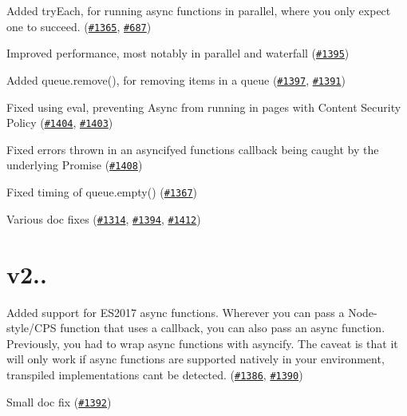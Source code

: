 \begin{DoxyItemize}
\item Added {\ttfamily try\+Each}, for running async functions in parallel, where you only expect one to succeed. (\href{https://github.com/caolan/async/issues/1365}{\tt \#1365}, \href{https://github.com/caolan/async/issues/687}{\tt \#687})
\item Improved performance, most notably in {\ttfamily parallel} and {\ttfamily waterfall} (\href{https://github.com/caolan/async/issues/1395}{\tt \#1395})
\item Added {\ttfamily queue.\+remove()}, for removing items in a {\ttfamily queue} (\href{https://github.com/caolan/async/issues/1397}{\tt \#1397}, \href{https://github.com/caolan/async/issues/1391}{\tt \#1391})
\item Fixed using {\ttfamily eval}, preventing Async from running in pages with Content Security Policy (\href{https://github.com/caolan/async/issues/1404}{\tt \#1404}, \href{https://github.com/caolan/async/issues/1403}{\tt \#1403})
\item Fixed errors thrown in an {\ttfamily asyncify}ed function\textquotesingle{}s callback being caught by the underlying Promise (\href{https://github.com/caolan/async/issues/1408}{\tt \#1408})
\item Fixed timing of {\ttfamily queue.\+empty()} (\href{https://github.com/caolan/async/issues/1367}{\tt \#1367})
\item Various doc fixes (\href{https://github.com/caolan/async/issues/1314}{\tt \#1314}, \href{https://github.com/caolan/async/issues/1394}{\tt \#1394}, \href{https://github.com/caolan/async/issues/1412}{\tt \#1412})
\end{DoxyItemize}

\section*{v2..}


\begin{DoxyItemize}
\item Added support for E\+S2017 {\ttfamily async} functions. Wherever you can pass a Node-\/style/\+C\+PS function that uses a callback, you can also pass an {\ttfamily async} function. Previously, you had to wrap {\ttfamily async} functions with {\ttfamily asyncify}. The caveat is that it will only work if {\ttfamily async} functions are supported natively in your environment, transpiled implementations can\textquotesingle{}t be detected. (\href{https://github.com/caolan/async/issues/1386}{\tt \#1386}, \href{https://github.com/caolan/async/issues/1390}{\tt \#1390})
\item Small doc fix (\href{https://github.com/caolan/async/issues/1392}{\tt \#1392})
\end{DoxyItemize}


